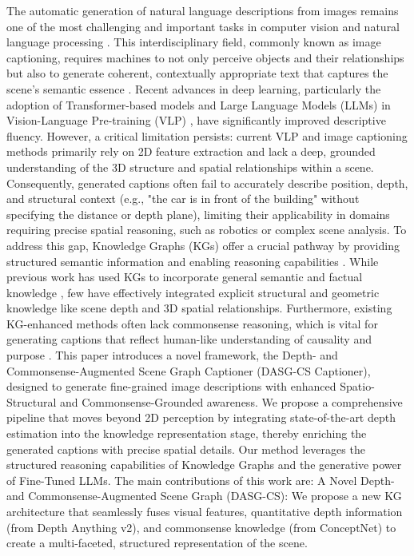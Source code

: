 \documentclass[runningheads,14pt]{llncs}
\begin{document}
The automatic generation of natural language descriptions from images remains one of the most challenging and important tasks in computer vision and natural language processing \cite{vinyals2015show, anderson2018bottom}. This interdisciplinary field, commonly known as image captioning, requires machines to not only perceive objects and their relationships but also to generate coherent, contextually appropriate text that captures the scene's semantic essence \cite{xu2015show, anderson2018bottom}.
Recent advances in deep learning, particularly the adoption of Transformer-based models and Large Language Models (LLMs) in Vision-Language Pre-training (VLP) \cite{li2022blip, alayrac2022flamingo}, have significantly improved descriptive fluency. However, a critical limitation persists: current VLP and image captioning methods primarily rely on 2D feature extraction and lack a deep, grounded understanding of the 3D structure and spatial relationships within a scene. Consequently, generated captions often fail to accurately describe position, depth, and structural context (e.g., "the car is in front of the building" without specifying the distance or depth plane), limiting their applicability in domains requiring precise spatial reasoning, such as robotics or complex scene analysis.
To address this gap, Knowledge Graphs (KGs) offer a crucial pathway by providing structured semantic information and enabling reasoning capabilities \cite{marino2017ok, wu2017image}. While previous work has used KGs to incorporate general semantic and factual knowledge \cite{yao2018exploring, li2022oscar}, few have effectively integrated explicit structural and geometric knowledge like scene depth and 3D spatial relationships. Furthermore, existing KG-enhanced methods often lack commonsense reasoning, which is vital for generating captions that reflect human-like understanding of causality and purpose \cite{zhao2021knowledge}.
This paper introduces a novel framework, the Depth- and Commonsense-Augmented Scene Graph Captioner (DASG-CS Captioner), designed to generate fine-grained image descriptions with enhanced Spatio-Structural and Commonsense-Grounded awareness. We propose a comprehensive pipeline that moves beyond 2D perception by integrating state-of-the-art depth estimation into the knowledge representation stage, thereby enriching the generated captions with precise spatial details. Our method leverages the structured reasoning capabilities of Knowledge Graphs and the generative power of Fine-Tuned LLMs.
The main contributions of this work are:
A Novel Depth- and Commonsense-Augmented Scene Graph (DASG-CS): We propose a new KG architecture that seamlessly fuses visual features, quantitative depth information (from Depth Anything v2), and commonsense knowledge (from ConceptNet) to create a multi-faceted, structured representation of the scene.
\end{document}
